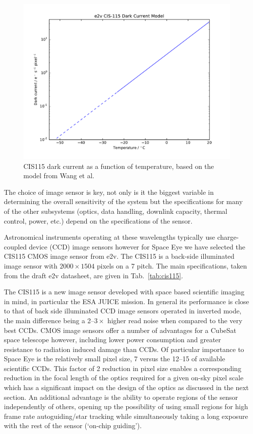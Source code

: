 \documentclass[]{iac}
\begin{document}
\begin{figure}[tp]
  \center \includegraphics[width=\columnwidth]{figures/CIS115DC.pdf}
  \caption{\label{fig:dc}CIS115 dark current as a function of temperature, based on the model from Wang et al.
    \cite{Wang2014}}
\end{figure}

The choice of image sensor is key, not only is it the biggest variable in determining the overall sensitivity of the
system but the specifications for many of the other subsystems (optics, data handling, downlink capacity, thermal
control, power, etc.) depend on the specifications of the sensor.

Astronomical instruments operating at these wavelengths typically use charge-coupled device (CCD) image sensors however
for Space Eye we have selected the CIS115 CMOS image sensor from e2v\cite{Jorden2014}. The CIS115 is a back-side
illuminated image sensor with $2000 \times 1504$ pixels on a \SI{7}{\micron} pitch. The main specifications, taken from
the draft e2v datasheet, are given in Tab.~\ref{tab:cis115}.

The CIS115 is a new image sensor developed with space based scientific imaging in mind, in particular the ESA JUICE
mission. In general its performance is close to that of back side illuminated CCD image sensors operated in inverted
mode, the main difference being a 2--$3\times$ higher read noise when compared to the very best CCDs. CMOS image sensors
offer a number of advantages for a CubeSat space telescope however, including lower power consumption and greater
resistance to radiation induced damage than CCDs. Of particular importance to Space Eye is the relatively small pixel
size, \SI{7}{\micron} versus the 12--\SI{15}{\micron} of available scientific CCDs. This factor of 2 reduction in pixel
size enables a corresponding reduction in the focal length of the optics required for a given on-sky pixel scale which
has a significant impact on the design of the optics as discussed in the next section. An additional advantage is the
ability to operate regions of the sensor independently of others, opening up the possibility of using small regions for
high frame rate autoguiding/star tracking while simultaneously taking a long exposure with the rest of the sensor
(`on-chip guiding').
\end{document}
